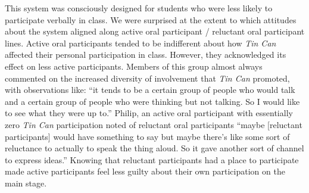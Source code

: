 

This system was consciously designed for students who were less likely to participate verbally in class. We were surprised at the extent to which attitudes about the system aligned along active oral participant / reluctant oral participant lines. Active oral participants tended to be indifferent about how \emph{Tin Can} affected their personal participation in class. However, they acknowledged its effect on less active participants.  Members of this group almost always commented on the increased diversity of involvement that \emph{Tin Can} promoted, with observations like: ``it tends to be a certain group of people who would talk and a certain group of people who were thinking but not talking. So I would like to see what they were up to.'' Philip, an active oral participant with essentially zero \emph{Tin Can} participation noted of reluctant oral participants ``maybe [reluctant participants] would have something to say but maybe there's like some sort of reluctance to actually to speak the thing aloud. So it gave another sort of channel to express ideas.'' Knowing that reluctant participants had a place to participate made active participants feel less guilty about their own participation on the main stage.


